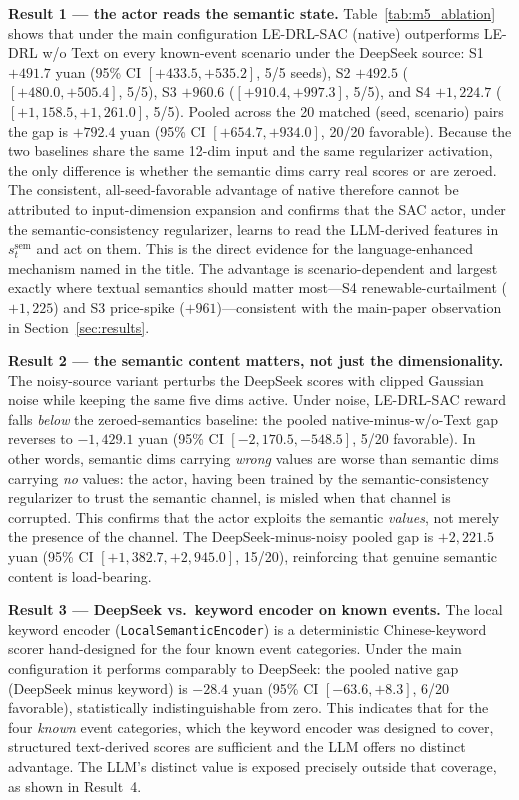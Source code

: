 \documentclass{ieeeaccess}
\begin{document}
\textbf{Result 1 --- the actor reads the semantic state.} Table~\ref{tab:m5_ablation} shows that under the main configuration LE-DRL-SAC (native) outperforms LE-DRL w/o Text on every known-event scenario under the DeepSeek source: S1 $+491.7$ yuan (95\% CI $[+433.5, +535.2]$, 5/5 seeds), S2 $+492.5$ ($[+480.0, +505.4]$, 5/5), S3 $+960.6$ ($[+910.4, +997.3]$, 5/5), and S4 $+1{,}224.7$ ($[+1{,}158.5, +1{,}261.0]$, 5/5). Pooled across the 20 matched (seed, scenario) pairs the gap is $+792.4$ yuan (95\% CI $[+654.7, +934.0]$, 20/20 favorable). Because the two baselines share the same 12-dim input and the same regularizer activation, the only difference is whether the semantic dims carry real scores or are zeroed. The consistent, all-seed-favorable advantage of native therefore cannot be attributed to input-dimension expansion and confirms that the SAC actor, under the semantic-consistency regularizer, learns to read the LLM-derived features in $s^{\mathrm{sem}}_t$ and act on them. This is the direct evidence for the language-enhanced mechanism named in the title. The advantage is scenario-dependent and largest exactly where textual semantics should matter most---S4 renewable-curtailment ($+1{,}225$) and S3 price-spike ($+961$)---consistent with the main-paper observation in Section~\ref{sec:results}.

\textbf{Result 2 --- the semantic content matters, not just the dimensionality.} The noisy-source variant perturbs the DeepSeek scores with clipped Gaussian noise while keeping the same five dims active. Under noise, LE-DRL-SAC reward falls \emph{below} the zeroed-semantics baseline: the pooled native-minus-w/o-Text gap reverses to $-1{,}429.1$ yuan (95\% CI $[-2{,}170.5, -548.5]$, 5/20 favorable). In other words, semantic dims carrying \emph{wrong} values are worse than semantic dims carrying \emph{no} values: the actor, having been trained by the semantic-consistency regularizer to trust the semantic channel, is misled when that channel is corrupted. This confirms that the actor exploits the semantic \emph{values}, not merely the presence of the channel. The DeepSeek-minus-noisy pooled gap is $+2{,}221.5$ yuan (95\% CI $[+1{,}382.7, +2{,}945.0]$, 15/20), reinforcing that genuine semantic content is load-bearing.

\textbf{Result 3 --- DeepSeek vs.\ keyword encoder on known events.} The local keyword encoder (\texttt{LocalSemanticEncoder}) is a deterministic Chinese-keyword scorer hand-designed for the four known event categories. Under the main configuration it performs comparably to DeepSeek: the pooled native gap (DeepSeek minus keyword) is $-28.4$ yuan (95\% CI $[-63.6, +8.3]$, 6/20 favorable), statistically indistinguishable from zero. This indicates that for the four \emph{known} event categories, which the keyword encoder was designed to cover, structured text-derived scores are sufficient and the LLM offers no distinct advantage. The LLM's distinct value is exposed precisely outside that coverage, as shown in Result~4.
\end{document}
